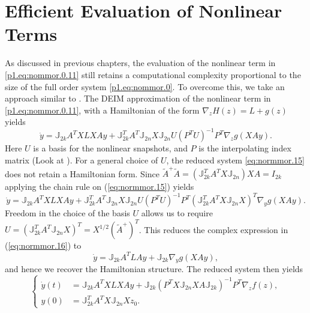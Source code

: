 \section{Efficient Evaluation of Nonlinear Terms} \label{sec:normmor.3}
As discussed in previous chapters, the evaluation of the nonlinear term in \eqref{p1.eq:nommor.0.11} still retains a computational complexity proportional to the size of the full order system \eqref{p1.eq:nommor.0}. To overcome this, we take an approach similar to . The DEIM approximation of the nonlinear term in \eqref{p1.eq:nommor.0.11}, with a Hamiltonian of the form $\nabla_z H(z) = L + g(z)$ yields
\begin{equation} \label{eq:normmor.15}
	\dot y = \mathbb J_{2k} A^TXLXAy + \mathbb J_{2k}^T A^T \mathbb J_{2n} X \mathbb J_{2n} U (P^TU)^{-1} P^T \nabla_z g(XAy).
\end{equation}
Here $U$ is a basis for the nonlinear snapshots, and $P$ is the interpolating index matrix (Look at ). For a general choice of $U$, the reduced system \eqref{eq:normmor.15} does not retain a Hamiltonian form. Since $ \tilde A^+ \tilde A = ( \mathbb J_{2k}^T A^T X \mathbb J_{2n}) X A = I_{2k}$ applying the chain rule on (\ref{eq:normmor.15}) yields
\begin{equation} \label{eq:normmor.16}
	\dot y = \mathbb J_{2k} A^TXLXAy + \mathbb J_{2k}^T A^T \mathbb J_{2n} X \mathbb J_{2n} U (P^TU)^{-1} P^T (\mathbb J_{2k}^T A^T X \mathbb J_{2n} X)^T \nabla_y g(XAy).
\end{equation}
Freedom in the choice of the basis $U$ allows us to require $U = (\mathbb J_{2k}^T A^T \mathbb J_{2n} X)^T = X^{1/2} (\tilde A^+)^T$. This reduces the complex expression in (\ref{eq:normmor.16}) to
\begin{equation} \label{eq:normmor.17}
	\dot y = \mathbb J_{2k} A^TLAy + \mathbb J_{2k} \nabla_y g(XAy),
\end{equation}
and hence we recover the Hamiltonian structure. The reduced system then yields
\begin{equation} \label{eq:normmor.18}
\left\{
\begin{aligned}
	\dot y(t) &= \mathbb J_{2k} A^TXLXAy + \mathbb J_{2k} ( P^TX \mathbb J_{2n} X A \mathbb J_{2k})^{-1} P^T \nabla_z f(z), \\
	y(0) &= \mathbb J_{2k}^T A^T X \mathbb J_{2n} X z_0.
\end{aligned}
\right.
\end{equation}
